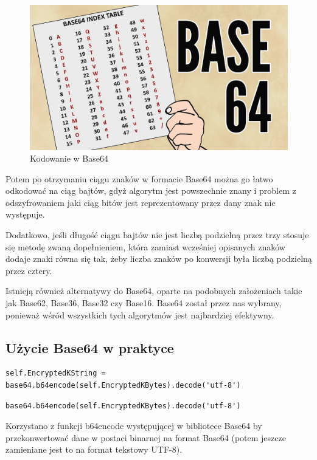 \begin{figure}[H]
    \centering
    \includegraphics[width=\textwidth]{Images/Base64Coding.jpg}
    \caption{Kodowanie w Base64}
	\label{fig:Base64Coding}
\end{figure}
Potem po otrzymaniu ciągu znaków w formacie Base64 można go łatwo odkodować na ciąg bajtów, gdyż algorytm jest powszechnie znany i problem z odszyfrowaniem jaki ciąg bitów jest reprezentowany przez dany znak nie występuje.

\vspace{1em}

Dodatkowo, jeśli długość ciągu bajtów nie jest liczbą podzielną przez trzy stosuje się metodę zwaną dopełnieniem, która zamiast wcześniej opisanych znaków dodaje znaki równa się tak, żeby liczba znaków po konwersji była liczbą podzielną przez cztery.

\vspace{1em}

Istnieją również alternatywy do Base64, oparte na podobnych założeniach takie jak Base62, Base36, Base32 czy Base16. Base64 został przez nas wybrany, ponieważ wśród wszystkich tych algorytmów jest najbardziej efektywny.
\subsection{Użycie Base64 w praktyce}
\begin{lstlisting}
self.EncryptedKString = base64.b64encode(self.EncryptedKBytes).decode('utf-8')
\end{lstlisting}
\begin{lstlisting}
base64.b64encode(self.EncryptedKBytes).decode('utf-8')
\end{lstlisting}
Korzystano z funkcji b64encode występującej w bibliotece Base64 by przekonwertować dane w postaci binarnej na format Base64 (potem jeszcze zamieniane jest to na format tekstowy UTF-8).
